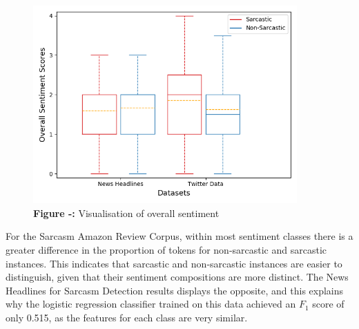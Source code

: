 \documentclass[12pt,a4paper]{article}
\begin{document}
\hspace{-35pt}
\begin{minipage}{0.5\textwidth}
\begin{figure}[H]
	\begin{center}
		\includegraphics[width=0.9\textwidth]{Images/boxcompare.png}\\
		\textbf{Figure -:} Visualisation of overall sentiment\\
	\end{center}
\end{figure}
\end{minipage}
\begin{minipage}{0.55\textwidth}
	
	
	
	For the Sarcasm Amazon Review Corpus, within most sentiment classes there is a greater difference in the proportion of tokens for non-sarcastic and sarcastic instances. This indicates that sarcastic and non-sarcastic instances are easier to distinguish, given that their sentiment compositions are more distinct. The News Headlines for Sarcasm Detection results displays the opposite, and this explains why the logistic regression classifier trained on this data achieved an $F_1$  score of only 0.515, as the features for each class are very similar.
\end{minipage}\vspace{-5pt}


\end{document}
